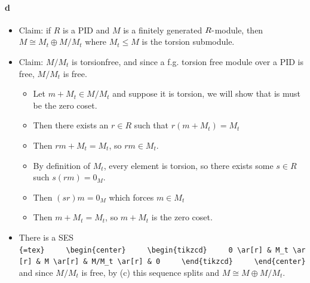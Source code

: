 \begin{solution}
\begin{itemize}
  \begin{center}
  \end{center}
\end{itemize}

\hypertarget{d-15}{%
\paragraph{d}\label{d-15}}

\begin{itemize}
\tightlist
\item
  Claim: if \(R\) is a PID and \(M\) is a finitely generated
  \(R{\hbox{-}}\)module, then \(M \cong M_t \oplus M/M_t\) where
  \(M_t \leq M\) is the torsion submodule.
\item
  Claim: \(M/M_t\) is torsionfree, and since a f.g. torsion free module
  over a PID is free, \(M/M_t\) is free.

  \begin{itemize}
  \tightlist
  \item
    Let \(m+M_t \in M/M_t\) and suppose it is torsion, we will show that
    is must be the zero coset.
  \item
    Then there exists an \(r\in R\) such that \(r(m + M_t) = M_t\)
  \item
    Then \(rm + M_t = M_t\), so \(rm\in M_t\).
  \item
    By definition of \(M_t\), every element is torsion, so there exists
    some \(s\in R\) such \(s(rm) = 0_M\).
  \item
    Then \((sr)m = 0_M\) which forces \(m\in M_t\)
  \item
    Then \(m + M_t = M_t\), so \(m+ M_t\) is the zero coset.
  \end{itemize}
\item
  There is a SES
  \texttt{\{=tex\}\ \ \ \ \ \textbackslash{}begin\{center\}\ \ \ \ \ \textbackslash{}begin\{tikzcd\}\ \ \ \ \ 0\ \textbackslash{}ar{[}r{]}\ \&\ M\_t\ \textbackslash{}ar{[}r{]}\ \&\ M\ \textbackslash{}ar{[}r{]}\ \&\ M/M\_t\ \textbackslash{}ar{[}r{]}\ \&\ 0\ \ \ \ \ \textbackslash{}end\{tikzcd\}\ \ \ \ \ \textbackslash{}end\{center\}}
  and since \(M/M_t\) is free, by (c) this sequence splits and
  \(M \cong M \oplus M/M_t\).
\end{itemize}

\end{solution}

